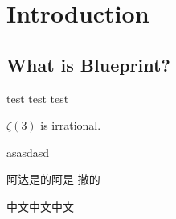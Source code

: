 %

\chapter{Introduction}

\section{What is Blueprint?}

test test test

\begin{center}
\end{center}

$\zeta(3)$ is irrational.

asasdasd

阿达是的阿是 撒的

中文中文中文
